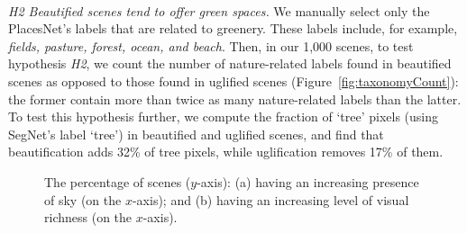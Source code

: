 \mbox{ } \\
\noindent
\emph{H2 Beautified scenes tend to offer green spaces.}
We manually select only the PlacesNet's labels that are related to greenery. These labels include, for example, \textit{fields, pasture, forest, ocean, and beach}. Then, in our 1,000 scenes, to test hypothesis \emph{H2}, we count the number of nature-related labels found in beautified scenes as opposed to those found in uglified scenes (Figure~\ref{fig:taxonomyCount}): the former contain more than twice as many nature-related labels than the latter.  To test this hypothesis further, we compute the fraction of `tree' pixels (using SegNet's label `tree') in beautified and uglified scenes, and  find that beautification adds  32\% of tree pixels, while uglification removes 17\% of them. 


\begin{figure}[!t]
	\centering
	\hspace*{-5mm}
\vspace{-0.4cm}
\label{fig:bin_figures}
\caption{The percentage of scenes ($y$-axis): (a) having an increasing presence of sky (on the $x$-axis); and (b) having an increasing level of visual richness  (on the $x$-axis).}
\vspace{-0.4cm}
\end{figure}



